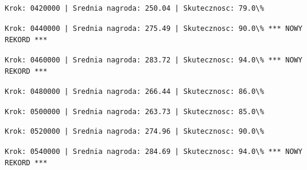 \documentclass[11pt]{article}
\begin{document}
    
    
    \begin{Verbatim}[commandchars=\\\{\}]
Krok: 0420000 | Srednia nagroda: 250.04 | Skutecznosc: 79.0\%

    \end{Verbatim}

    
    
    \begin{Verbatim}[commandchars=\\\{\}]
Krok: 0440000 | Srednia nagroda: 275.49 | Skutecznosc: 90.0\% *** NOWY REKORD ***

    \end{Verbatim}

    
    
    \begin{Verbatim}[commandchars=\\\{\}]
Krok: 0460000 | Srednia nagroda: 283.72 | Skutecznosc: 94.0\% *** NOWY REKORD ***

    \end{Verbatim}

    
    
    \begin{Verbatim}[commandchars=\\\{\}]
Krok: 0480000 | Srednia nagroda: 266.44 | Skutecznosc: 86.0\%

    \end{Verbatim}

    
    
    \begin{Verbatim}[commandchars=\\\{\}]
Krok: 0500000 | Srednia nagroda: 263.73 | Skutecznosc: 85.0\%

    \end{Verbatim}

    
    
    \begin{Verbatim}[commandchars=\\\{\}]
Krok: 0520000 | Srednia nagroda: 274.96 | Skutecznosc: 90.0\%

    \end{Verbatim}

    
    
    \begin{Verbatim}[commandchars=\\\{\}]
Krok: 0540000 | Srednia nagroda: 284.69 | Skutecznosc: 94.0\% *** NOWY REKORD ***

    \end{Verbatim}
\end{document}
